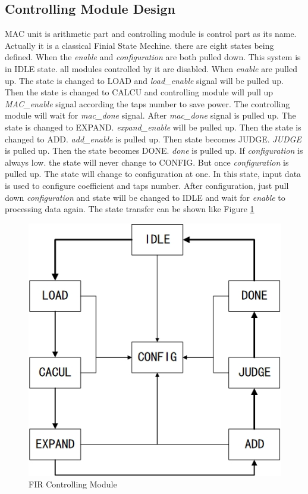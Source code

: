 \documentclass[a4paper]{article}
\begin{document}
\subsection{Controlling Module Design}\label{subsec1_2}
MAC unit is arithmetic part and controlling module is control part as its name. Actually it is a classical Finial State Mechine. there are eight states being defined. When the \emph{enable} and \emph{configuration} are both pulled down. This system is in IDLE state. all modules controlled by it are disabled. When \emph{enable} are pulled up. The state is changed to LOAD and \emph{load\_enable} signal will be pulled up. Then the state is changed to CALCU and controlling module will pull up \emph{MAC\_enable} signal according the taps number to save power. The controlling module will wait for \emph{mac\_done} signal. After \emph{mac\_done} signal is pulled up. The state is changed to EXPAND. \emph{expand\_enable} will be pulled up. Then the state is changed to ADD. \emph{add\_enable} is pulled up. Then state becomes JUDGE. \emph{JUDGE} is pulled up. Then the state becomes DONE. \emph{done} is pulled up. If \emph{configuration} is always low. the state will never change to CONFIG. But once \emph{configuration} is pulled up. The state will change to configuration at one. In this state, input data is used to configure coefficient and taps number. After configuration, just pull down \emph{configuration} and state will be changed to IDLE and wait for \emph{enable} to processing data again. The state transfer can be shown like Figure \ref{fig:CONTROL}
\begin{figure}[htb]
	\centering
	\includegraphics[scale=0.6]{pic/control}
	\caption{FIR Controlling Module}
	\label{fig:CONTROL}
\end{figure}
\end{document}

